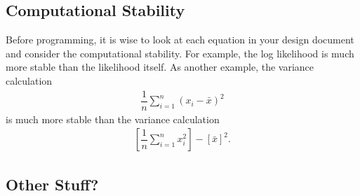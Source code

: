 \documentclass{article}
\begin{document}
\subsection{Computational Stability}
Before programming, it is wise to  look at each equation in your design document and consider the computational stability. For example, the log likelihood is much more stable than the likelihood itself. As another example, the variance calculation
\begin{align*}
\dfrac{1}{n} \sum_{i=1}^n (x_i - \bar{x})^2 
\end{align*}
is much more stable than the variance calculation
\begin{align*}
\left[ \dfrac{1}{n}  \sum_{i=1}^n x_i^2 \right] - \left[\bar{x} \right]^2 .
\end{align*}

\subsection{Other Stuff?}
\end{document}
